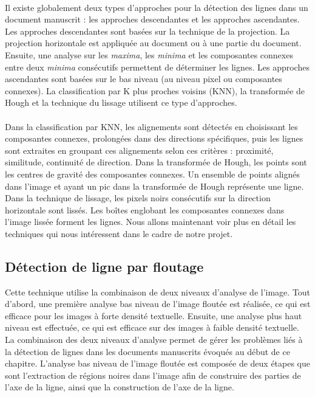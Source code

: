 \paragraph{}
Il existe globalement deux types d'approches pour la détection des lignes dans un document manuscrit : les approches
descendantes et les approches ascendantes. Les approches descendantes sont basées sur la technique de la projection.
La projection horizontale est appliquée au document ou à une partie du document. Ensuite, une analyse sur les \textit{maxima},
les \textit{minima} et les composantes connexes entre deux \textit{minima} consécutifs permettent de déterminer les lignes.
Les approches ascendantes sont basées sur le bas niveau (au niveau pixel ou composantes connexes). La classification
par K plus proches voisins (KNN), la transformée de Hough et la technique du lissage utilisent ce type d'approches.

\paragraph{}
Dans la classification par KNN, les alignements sont détectés en choisissant les composantes connexes, prolongées dans des
directions spécifiques, puis les lignes sont extraites en groupant ces alignements selon ces critères : proximité, similitude,
continuité de direction. Dans la transformée de Hough, les points sont les centres de gravité des composantes connexes.
Un ensemble de points alignés dans l’image et ayant un pic dans la transformée de Hough représente une ligne. Dans la technique
de lissage, les pixels noirs consécutifs sur la direction horizontale sont lissés. Les boîtes englobant les composantes connexes
dans l’image lissée forment les lignes. Nous allons maintenant voir plus en détail les techniques qui nous intéressent
dans le cadre de notre projet.

\subsection{Détection de ligne par floutage}

Cette technique utilise la combinaison de deux niveaux d'analyse de l'image. Tout d'abord, une première analyse bas niveau
de l'image floutée est réalisée, ce qui est efficace pour les images à forte densité textuelle. Ensuite, une analyse plus
haut niveau est effectuée, ce qui est efficace sur des images à faible densité textuelle. La combinaison des deux niveaux
d'analyse permet de gérer les problèmes liés à la détection de lignes dans les documents manuscrits évoqués au début de ce chapitre.
L'analyse bas niveau de l'image floutée est composée de deux étapes que sont l'extraction de régions noires dans l'image afin de
construire des parties de l'axe de la ligne, ainsi que la construction de l'axe de la ligne.

